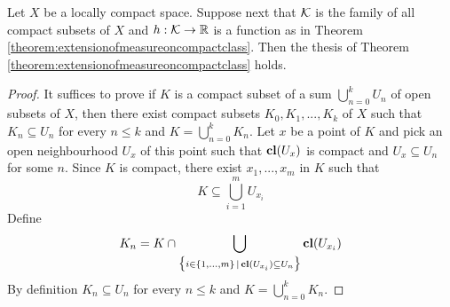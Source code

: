 \begin{corollary}\label{corollary:extensionofmeasureoncompactsubsets}
Let $X$ be a locally compact space. Suppose next that ${\mathcal K}$ is the family of all compact subsets of $X$ and $h:{\mathcal K}\rightarrow {\mathbb R}$ is a function as in Theorem \ref{theorem:extensionofmeasureoncompactclass}. Then the thesis of Theorem \ref{theorem:extensionofmeasureoncompactclass} holds.
\end{corollary}
\begin{proof}
It suffices to prove if $K$ is a compact subset of a sum $\bigcup_{n=0}^kU_n$ of open subsets of $X$, then there exist compact subsets $K_0,K_1,...,K_k$ of $X$ such that $K_n\subseteq U_n$ for every $n\leq k$ and $K = \bigcup_{n=0}^kK_n$. Let $x$ be a point of $K$ and pick an open neighbourhood $U_x$ of this point such that $\mathbf{cl}(U_x)$ is compact and $U_x\subseteq U_n$ for some $n$. Since $K$ is compact, there exist $x_1,...,x_m$ in $K$ such that
$$K\subseteq \bigcup_{i=1}^mU_{x_i}$$
Define
$$K_n = K\cap \bigcup_{\big\{i\in \{1,...,m\}\,|\,\mathbf{cl}(U_{x_i})\subseteq U_n\big\}} \mathbf{cl}(U_{x_i})$$
By definition $K_n\subseteq U_n$ for every $n\leq k$ and $K = \bigcup_{n=0}^kK_n$.
\end{proof}




\small



